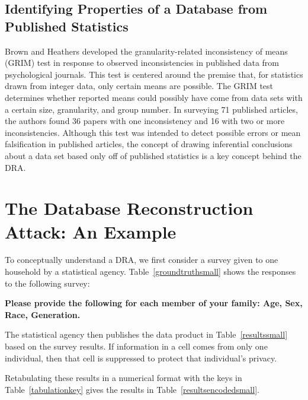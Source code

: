 \documentclass[5p,times,11pt]{elsarticle}
\begin{document}
\subsection{Identifying Properties of a Database from Published Statistics}
Brown and Heathers \cite{grim} developed the granularity-related inconsistency of means (GRIM) test in response to observed inconsistencies in published data from psychological journals. This test is centered around the premise that, for statistics drawn from integer data, only certain means are possible. The GRIM test determines whether reported means could possibly have come from data sets with a certain size, granularity, and group number. In surveying 71 published articles, the authors found 36 papers with one inconsistency and 16 with two or more inconsistencies. Although this test was intended to detect possible errors or mean falsification in published articles, the concept of drawing inferential conclusions about a data set based only off of published statistics is a key concept behind the DRA.



\section{The Database Reconstruction Attack: An Example}


To conceptually understand a DRA, we first consider a survey given to one household by a statistical agency. Table~\ref{groundtruthsmall} shows the responses to the following survey:

\textbf{Please provide the following for each member
of your family:
Age, Sex, Race, Generation.}


The statistical agency then publishes the data product in Table~\ref{resultssmall} based on the survey results. If information in a cell comes from only one individual, then that cell is suppressed to protect that individual's privacy.

Retabulating these results in a numerical format with the keys in Table~\ref{tabulationkey} gives the results in Table~\ref{resultsencodedsmall}.
\end{document}
